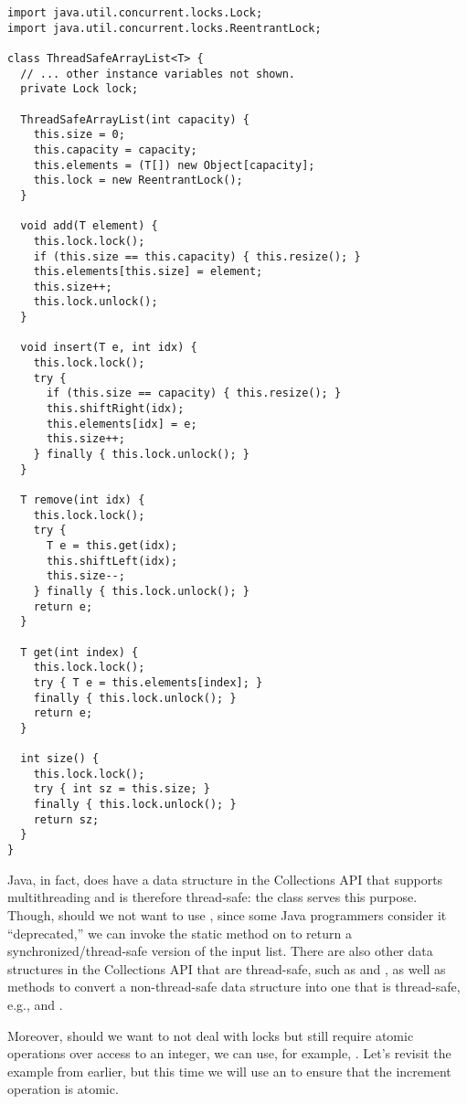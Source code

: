 \begin{lstlisting}[language=MyJava]
import java.util.concurrent.locks.Lock;
import java.util.concurrent.locks.ReentrantLock;

class ThreadSafeArrayList<T> {
  // ... other instance variables not shown.
  private Lock lock;

  ThreadSafeArrayList(int capacity) {
    this.size = 0;
    this.capacity = capacity;
    this.elements = (T[]) new Object[capacity];
    this.lock = new ReentrantLock();
  }

  void add(T element) {
    this.lock.lock();
    if (this.size == this.capacity) { this.resize(); }
    this.elements[this.size] = element;
    this.size++;
    this.lock.unlock();
  }

  void insert(T e, int idx) {
    this.lock.lock();
    try {
      if (this.size == capacity) { this.resize(); }
      this.shiftRight(idx);
      this.elements[idx] = e;
      this.size++;
    } finally { this.lock.unlock(); }
  }

  T remove(int idx) {
    this.lock.lock();
    try {
      T e = this.get(idx);
      this.shiftLeft(idx);
      this.size--;
    } finally { this.lock.unlock(); }
    return e;
  }

  T get(int index) {
    this.lock.lock();
    try { T e = this.elements[index]; }
    finally { this.lock.unlock(); }
    return e;
  }

  int size() {
    this.lock.lock();
    try { int sz = this.size; }
    finally { this.lock.unlock(); }
    return sz;
  }
}
\end{lstlisting}

Java, in fact, does have a data structure in the Collections API that supports multithreading and is therefore thread-safe: the  class serves this purpose. 
Though, should we not want to use , since some Java programmers consider it ``deprecated,'' we can invoke the static  method on  to return a synchronized/thread-safe version of the input list. 
There are also other data structures in the Collections API that are thread-safe, such as  and , as well as methods to convert a non-thread-safe data structure into one that is thread-safe, e.g.,  and .

Moreover, should we want to not deal with locks but still require atomic operations over access to an integer, we can use, for example, . 
Let's revisit the  example from earlier, but this time we will use an  to ensure that the increment operation is atomic.

